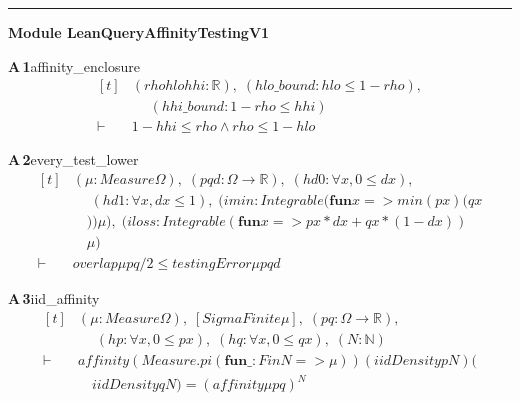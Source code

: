 \documentclass[conference]{IEEEtran}
\theoremstyle{definition}
\newcommand{\lean}[1]{\textsf{\footnotesize #1}}
\begin{document}
\vspace{4pt}\noindent\rule{\columnwidth}{0.4pt}\par\vspace{2pt}
\noindent\textbf{Module \lean{LeanQueryAffinityTestingV1}}\par\vspace{3pt}

\noindent\textbf{A\,1}\quad\lean{affinity\_enclosure}
{\footnotesize\[ \begin{aligned}[t]
&(\mathit{rho} \mathit{hlo} \mathit{hhi} : \mathbb{R} ),\; (\mathit{hlo\_bound} : \mathit{hlo} \leq 1-\mathit{rho}),\\
&\quad \; (\mathit{hhi\_bound} : 1-\mathit{rho} \leq \mathit{hhi})\\
\vdash\;&1-\mathit{hhi} \leq \mathit{rho} \wedge \mathit{rho} \leq 1-\mathit{hlo}
\end{aligned} \]}

\noindent\textbf{A\,2}\quad\lean{every\_test\_lower}
{\footnotesize\[ \begin{aligned}[t]
&(\mu : \mathit{Measure} \Omega ),\; (\mathit{p} \mathit{q} \mathit{d} : \Omega \to \mathbb{R} ),\; (\mathit{hd0} : \forall \mathit{x}, 0 \leq \mathit{d} \mathit{x}),\\
&\quad \; (\mathit{hd1} : \forall \mathit{x}, \mathit{d} \mathit{x} \leq 1),\; (\mathit{imin} : \mathit{Integrable} (\mathbf{fun} \mathit{x} => \mathit{min} (\mathit{p} \mathit{x}) (\mathit{q} \mathit{x}\\
&\quad )) \mu ),\; (\mathit{iloss} : \mathit{Integrable} (\mathbf{fun} \mathit{x} => \mathit{p} \mathit{x}*\mathit{d} \mathit{x}+\mathit{q} \mathit{x}*(1-\mathit{d} \mathit{x}))\\
&\quad \mu )\\
\vdash\;&\mathit{overlap} \mu \mathit{p} \mathit{q}/2 \leq \mathit{testingError} \mu \mathit{p} \mathit{q} \mathit{d}
\end{aligned} \]}

\noindent\textbf{A\,3}\quad\lean{iid\_affinity}
{\footnotesize\[ \begin{aligned}[t]
&(\mu : \mathit{Measure} \Omega ),\; [\mathit{SigmaFinite} \mu ],\; (\mathit{p} \mathit{q} : \Omega \to \mathbb{R} ),\\
&\quad \; (\mathit{hp} : \forall \mathit{x}, 0 \leq \mathit{p} \mathit{x}),\; (\mathit{hq} : \forall \mathit{x}, 0 \leq \mathit{q} \mathit{x}),\; (\mathit{N} : \mathbb{N} )\\
\vdash\;&\mathit{affinity} (\mathit{Measure}.\mathit{pi} (\mathbf{fun} \mathit{\_} : \mathit{Fin} \mathit{N} => \mu )) (\mathit{iidDensity} \mathit{p} \mathit{N}) (\\
&\quad \mathit{iidDensity} \mathit{q} \mathit{N}) = (\mathit{affinity} \mu \mathit{p} \mathit{q})^{\mathit{N}}
\end{aligned} \]}
\end{document}
